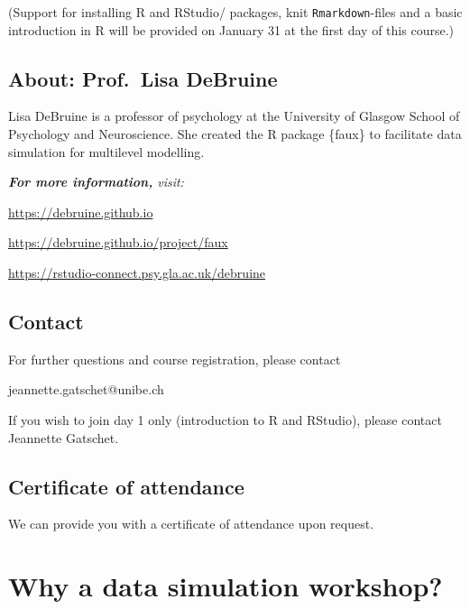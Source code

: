 \documentclass[
  letterpaper,
  DIV=11,
  numbers=noendperiod,
  oneside]{scrreprt}
\begin{document}
(Support for installing R and RStudio/ packages, knit
\texttt{Rmarkdown}-files and a basic introduction in R will be provided
on January 31 at the first day of this course.)

\hypertarget{about-prof.-lisa-debruine}{%
\section*{About: Prof.~Lisa DeBruine}\label{about-prof.-lisa-debruine}}


Lisa DeBruine is a professor of psychology at the University of Glasgow
School of Psychology and Neuroscience. She created the R package
\{faux\} to facilitate data simulation for multilevel modelling.

\emph{\textbf{For more information,} visit:}

\url{https://debruine.github.io}

\url{https://debruine.github.io/project/faux}

\url{https://rstudio-connect.psy.gla.ac.uk/debruine}

\hypertarget{contact}{%
\section*{Contact}\label{contact}}


For further questions and course registration, please contact

jeannette.gatschet@unibe.ch

If you wish to join day 1 only (introduction to R and RStudio), please
contact Jeannette Gatschet.

\hypertarget{certificate-of-attendance}{%
\section*{Certificate of attendance}\label{certificate-of-attendance}}


We can provide you with a certificate of attendance upon request.


\hypertarget{why-a-data-simulation-workshop}{%
\chapter*{Why a data simulation
workshop?}\label{why-a-data-simulation-workshop}}
\end{document}
